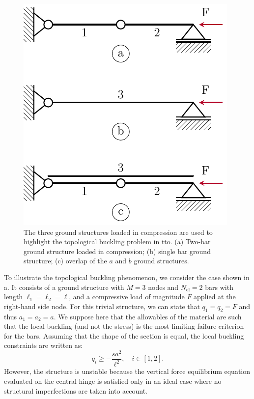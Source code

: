 \begin{figure}
    \centering
    \includegraphics{figures/04_TTO_improvements/01_3_bars_chain/3_bars_chain.pdf}
    \caption{The three ground structures loaded in compression are used to highlight the topological buckling problem in \gls{tto}. (a) Two-bar ground structure loaded in compression; (b) single bar ground structure; (c) overlap of the $a$ and $b$ ground structures.}
    \label{fig:04_chain_buck}
\end{figure}

To illustrate the topological buckling phenomenon, we consider the case shown in a. It consists of a ground structure with $M=3$ nodes and $N_{\text{el}}=2$ bars with length $\ell_1=\ell_2=\ell$, and a compressive load of magnitude $F$ applied at the right-hand side node. For this trivial structure, we can state that $q_1=q_2=F$ and thus $a_1=a_2=a$. We suppose here that the allowables of the material are such that the local buckling (and not the stress) is the most limiting failure criterion for the bars. Assuming that the shape of the section is equal, the local buckling constraints are written as:
\begin{equation}
    q_i\geq -\frac{s a^2}{\ell^2}, \quad i\in[1,2].
    \label{eq:04_chain_1}
\end{equation}
However, the structure is unstable because the vertical force equilibrium equation evaluated on the central hinge is satisfied only in an ideal case where no structural imperfections are taken into account.

